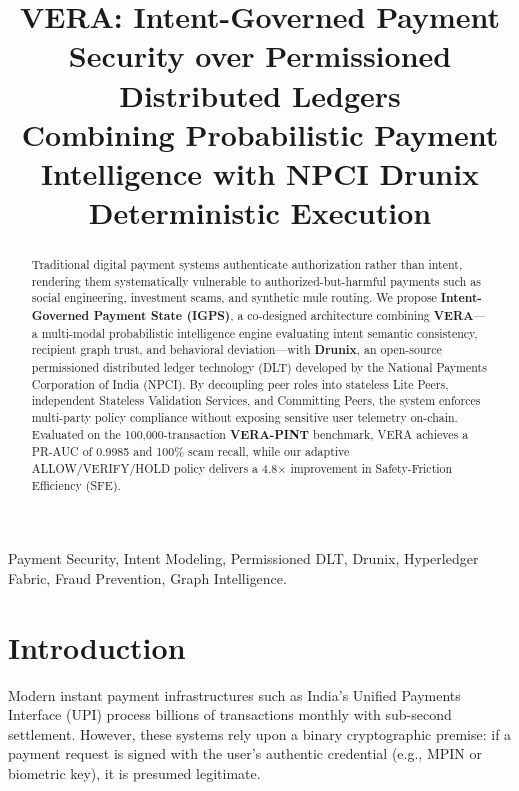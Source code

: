 \documentclass[10pt,conference]{IEEEtran}
\begin{document}
\title{VERA: Intent-Governed Payment Security over Permissioned Distributed Ledgers\\
\large Combining Probabilistic Payment Intelligence with NPCI Drunix Deterministic Execution}

\author{
}

\maketitle

\begin{abstract}
Traditional digital payment systems authenticate authorization rather than intent, rendering them systematically vulnerable to authorized-but-harmful payments such as social engineering, investment scams, and synthetic mule routing. We propose \textbf{Intent-Governed Payment State (IGPS)}, a co-designed architecture combining \textbf{VERA}—a multi-modal probabilistic intelligence engine evaluating intent semantic consistency, recipient graph trust, and behavioral deviation—with \textbf{Drunix}, an open-source permissioned distributed ledger technology (DLT) developed by the National Payments Corporation of India (NPCI). By decoupling peer roles into stateless Lite Peers, independent Stateless Validation Services, and Committing Peers, the system enforces multi-party policy compliance without exposing sensitive user telemetry on-chain. Evaluated on the 100,000-transaction \textbf{VERA-PINT} benchmark, VERA achieves a PR-AUC of 0.9985 and 100\% scam recall, while our adaptive ALLOW/VERIFY/HOLD policy delivers a 4.8$\times$ improvement in Safety-Friction Efficiency (SFE).
\end{abstract}

\begin{IEEEkeywords}
Payment Security, Intent Modeling, Permissioned DLT, Drunix, Hyperledger Fabric, Fraud Prevention, Graph Intelligence.
\end{IEEEkeywords}

\section{Introduction}
Modern instant payment infrastructures such as India's Unified Payments Interface (UPI) process billions of transactions monthly with sub-second settlement. However, these systems rely upon a binary cryptographic premise: if a payment request is signed with the user's authentic credential (e.g., MPIN or biometric key), it is presumed legitimate.
\end{document}
